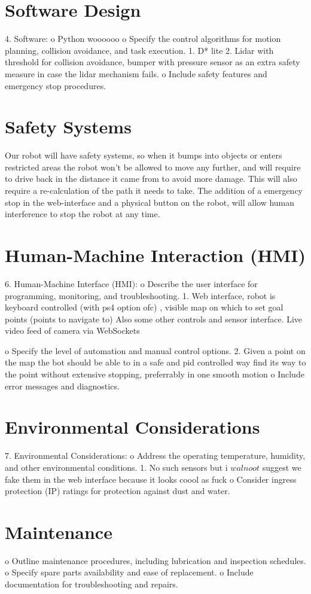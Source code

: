 \documentclass[a4paper]{article}
\begin{document}
\section*{Software Design}
4.	Software:
o	Python woooooo
o	Specify the control algorithms for motion planning, collision avoidance, and task execution.
1.	D* lite
2.	Lidar with threshold for collision avoidance, bumper with pressure sensor as an extra safety measure in case the lidar mechanism fails.
o	Include safety features and emergency stop procedures.

\section*{Safety Systems}
Our robot will have safety systems, so when it bumps into objects or enters restricted areas the robot won't be allowed to move any further, and will require to drive back in the distance it came from to avoid more damage. This will also require a re-calculation of the path it needs to take. The addition of a emergency stop in the web-interface and a physical button on the robot, will allow human interference to stop the robot at any time.

\section*{Human-Machine Interaction (HMI)}
6.	Human-Machine Interface (HMI):
o	Describe the user interface for programming, monitoring, and troubleshooting.
1. Web interface, robot is keyboard controlled (with ps4 option ofc) , 		visible map on which to set goal points (points to navigate to)
Also some other controls and sensor interface. Live video feed of 		camera via WebSockets 	

o	Specify the level of automation and manual control options.
2. Given a point on the map the bot should be able to in a safe and pid controlled way find its way to the point without extensive stopping, preferrably in one smooth motion
o	Include error messages and diagnostics.

\section*{Environmental Considerations}
7.	Environmental Considerations:
o	Address the operating temperature, humidity, and other environmental conditions.
1. No such sensors but i \(walnoot\) suggest we fake them in the web interface 		because it looks coool as fuck 
o	Consider ingress  protection (IP) ratings for protection against dust and water.

\section*{Maintenance}
o	Outline maintenance procedures, including lubrication and inspection schedules.
o	Specify spare parts availability and ease of replacement.
o	Include documentation for troubleshooting and repairs. 





\end{document}
